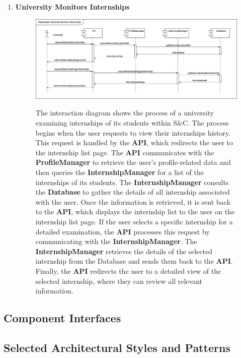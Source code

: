 \begin{enumerate}
    \newpage
    \item \textbf{University Monitors Internships}
    \begin{figure}[h!]
            \centering  \includegraphics[width=1\textwidth]{DD/Images/Interactions/INT19_UniversityMonitorsInternships.drawio.png}
            \label{fig:ComponentViewDiagram}
            \caption*{The interaction diagram shows the process of a university examining internships of its students within S\&C. The process begins when the user requests to view their internships history. This request is handled by the \textbf{API}, which redirects the user to the internship list page. The \textbf{API} communicates with the \textbf{ProfileManager} to retrieve the user’s profile-related data and then queries the \textbf{InternshipManager} for a list of the internships of its students.
            The \textbf{InternshipManager} consults the \textbf{Database} to gather the details of all internship associated with the user. 
            Once the information is retrieved, it is sent back to the \textbf{API}, which displays the internship list to the user on the internship list page.
            If the user selects a specific internship for a detailed examination, the \textbf{API} processes this request by communicating with the \textbf{InternshipManager}. The \textbf{InternshipManager} retrieves the details of the selected internship from the Database and sends them back to the \textbf{API}. Finally, the \textbf{API} redirects the user to a detailed view of the selected internship, where they can review all relevant information.
            }
    \end{figure}
    
\end{enumerate}
\newpage
\subsection{Component Interfaces}
\newpage
\subsection{Selected Architectural Styles and Patterns}
